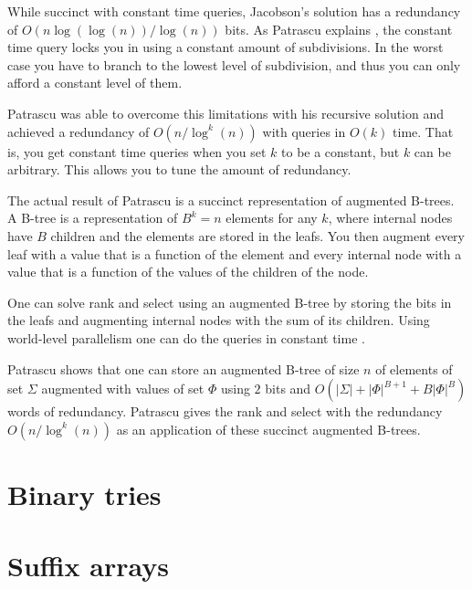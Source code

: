 \documentclass[11pt]{article}
\newcommand{\bigo}{O}
\begin{document}
While succinct with constant time queries, Jacobson's solution has a
redundancy of $\bigo(n \log(\log(n)) / \log(n))$ bits. As Patrascu
explains \cite{patrascu08}, the constant time query locks you in using
a constant amount of subdivisions. In the worst case you have to
branch to the lowest level of subdivision, and thus you can only
afford a constant level of them.

Patrascu was able to overcome this limitations with his recursive
solution \cite{patrascu08} and achieved a redundancy of $\bigo(n /
\log^k(n))$ with queries in $\bigo(k)$ time. That is, you get constant
time queries when you set $k$ to be a constant, but $k$ can be
arbitrary. This allows you to tune the amount of redundancy.

The actual result of Patrascu is a succinct representation of
augmented B-trees. A B-tree is a representation of $B^k = n$ elements
for any $k$, where internal nodes have $B$ children and the elements
are stored in the leafs. You then augment every leaf with a value that
is a function of the element and every internal node with a value that
is a function of the values of the children of the node.

One can solve rank and select using an augmented B-tree
\cite{patrascu08} by storing the bits in the leafs and augmenting
internal nodes with the sum of its children. Using world-level
parallelism one can do the queries in constant time \cite{patrascu08}.

Patrascu shows \cite{patrascu08} that one can store an augmented
B-tree of size $n$ of elements of set $\Sigma$ augmented with values
of set $\Phi$ using $2$ bits and $\bigo(|\Sigma| + |\Phi|^{B+1} +
B|\Phi|^B)$ words of redundancy. Patrascu gives the rank and select
with the redundancy $\bigo(n / \log^k(n))$ as an application of these
succinct augmented B-trees.

\section{Binary tries}

\section{Suffix arrays}
\end{document}
